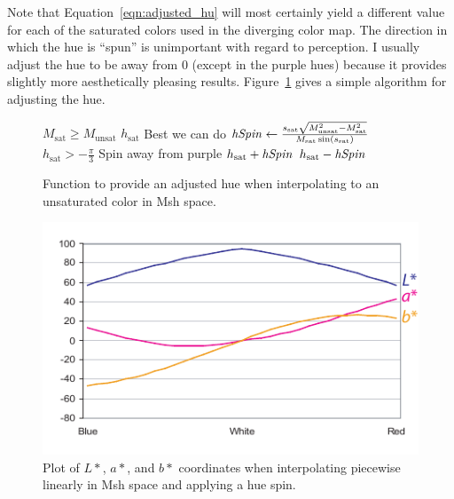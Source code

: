 \documentclass{acmsiggraph}               %
\newcommand{\Msh}{Msh\xspace}
\begin{document}
Note that Equation~\ref{eqn:adjusted_hu} will most certainly yield a
different value for each of the saturated colors used in the diverging
color map.  The direction in which the hue is ``spun'' is unimportant with
regard to perception.  I usually adjust the hue to be away from 0 (except
in the purple hues) because it provides slightly more aesthetically
pleasing results.  Figure~\ref{fig:AdjustHue} gives a simple algorithm for
adjusting the hue.

\begin{figure}
  \begin{codebox}
    \li \If $M_\mathrm{sat} \geq M_\mathrm{unsat}$
    \li \Then \Return $h_\mathrm{sat}$ \RComment Best we can do
    \li \Else $\id{hSpin} \leftarrow
                 \frac{s_\mathrm{sat}\sqrt{M_\mathrm{unsat}^2-M_\mathrm{sat}^2}}
		      {M_\mathrm{sat} \sin(s_\mathrm{sat})}$
    \li       \If $h_\mathrm{sat} > -\frac{\pi}{3}$ \RComment Spin away from purple
    \li       \Then \Return $h_\mathrm{sat} + \id{hSpin}$
    \li       \Else \Return $h_\mathrm{sat} - \id{hSpin}$
              \End
        \End
  \end{codebox}
  \caption{Function to provide an adjusted hue when interpolating to an
    unsaturated color in \Msh space.}
  \label{fig:AdjustHue}
\end{figure}

\begin{figure}
  \centering
  \includegraphics{images/HueSpinPlot}
  \caption{Plot of $L*$, $a*$, and $b*$ coordinates when interpolating
    piecewise linearly in \Msh space and applying a hue spin.}
  \label{fig:hue_spin_plot}
\end{figure}
\end{document}
